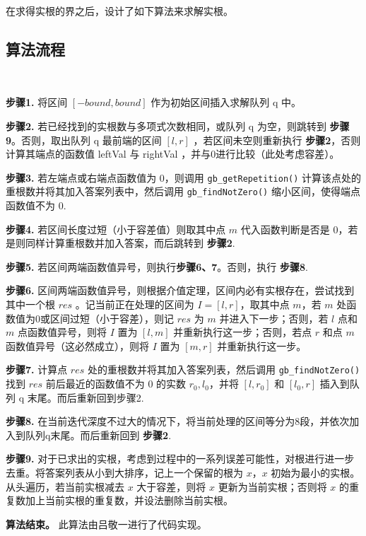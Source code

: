 在求得实根的界之后，设计了如下算法来求解实根。

\subsection{算法流程}

\begin{algorithm}[朴素二分法]~
	
	\textbf{步骤1.} 将区间 $[-bound, bound]$ 作为初始区间插入求解队列 q 中。
	
	\textbf{步骤2.} 若已经找到的实根数与多项式次数相同，或队列 q 为空，则跳转到 \textbf{步骤9}。否则，取出队列 q 最前端的区间 $[l, r]$ ，若区间未空则重新执行 \textbf{步骤2}，否则计算其端点的函数值 leftVal 与 rightVal ，并与0进行比较（此处考虑容差）。
	
	\textbf{步骤3.} 若左端点或右端点函数值为 0，则调用 \verb|gb_getRepetition()| 计算该点处的重根数并将其加入答案列表中，然后调用 \verb|gb_findNotZero()| 缩小区间，使得端点函数值不为 0.
	
	\textbf{步骤4.} 若区间长度过短（小于容差值）则取其中点 $m$ 代入函数判断是否是 0，若是则同样计算重根数并加入答案，而后跳转到 \textbf{步骤2}.
	
	\textbf{步骤5.} 若区间两端函数值异号，则执行\textbf{步骤6、7}。否则，执行 \textbf{步骤8}.
	
	\textbf{步骤6.} 区间两端函数值异号，则根据介值定理，区间内必有实根存在，尝试找到其中一个根 $res$ 。记当前正在处理的区间为 $I = [l, r]$，取其中点 $m$，若 $m$ 处函数值为0或区间过短（小于容差），则记 $res$ 为 $m$ 并进入下一步；否则，若 $l$ 点和 $m$ 点函数值异号，则将 $I$ 置为 $[l, m]$ 并重新执行这一步；否则，若点 $r$ 和点 $m$ 函数值异号（这必然成立），则将 $I$ 置为 $[m, r]$ 并重新执行这一步。
	
	\textbf{步骤7.} 计算点 $res$ 处的重根数并将其加入答案列表，然后调用 \verb|gb_findNotZero()| 找到 $res$ 前后最近的函数值不为 0 的实数 $r_0, l_0$，并将 $[l, r_0]$ 和 $[l_0, r]$ 插入到队列 q 末尾。而后重新回到步骤2.
	
	\textbf{步骤8.} 在当前迭代深度不过大的情况下，将当前处理的区间等分为8段，并依次加入到队列q末尾。而后重新回到 \textbf{步骤2}.
	
	\textbf{步骤9.} 对于已求出的实根，考虑到过程中的一系列误差可能性，对根进行进一步去重。将答案列表从小到大排序，记上一个保留的根为 $x$，$x$ 初始为最小的实根。从头遍历，若当前实根减去 $x$ 大于容差，则将 $x$ 更新为当前实根；否则将 $x$ 的重复数加上当前实根的重复数，并设法删除当前实根。
	
	\textbf{算法结束。} 此算法由吕敬一进行了代码实现。
	
	
\end{algorithm}

